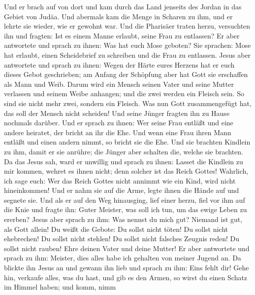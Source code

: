 Und er brach auf von dort und kam durch das Land jenseits
des Jordan in das Gebiet von Judäa. Und abermals kam die Menge in
Scharen zu ihm, und er lehrte sie wieder, wie er gewohnt war.
 Und die Pharisäer traten herzu, versuchten ihn und
fragten: Ist es einem Manne erlaubt, seine Frau zu entlassen?
 Er aber antwortete und sprach zu ihnen: Was hat euch Mose
geboten?  Sie sprachen: Mose hat erlaubt, einen
Scheidebrief zu schreiben und die Frau zu entlassen. 
Jesus aber antwortete und sprach zu ihnen: Wegen der Härte eures Herzens
hat er euch dieses Gebot geschrieben;  am Anfang der
Schöpfung aber hat Gott sie erschaffen als Mann und Weib. 
Darum wird ein Mensch seinen Vater und seine Mutter verlassen und seinem
Weibe anhangen;  und die zwei werden ein Fleisch sein. So
sind sie nicht mehr zwei, sondern ein Fleisch.  Was nun
Gott zusammengefügt hat, das soll der Mensch nicht scheiden!
 Und seine Jünger fragten ihn zu Hause nochmals darüber.
 Und er sprach zu ihnen: Wer seine Frau entläßt und eine
andere heiratet, der bricht an ihr die Ehe.  Und wenn
eine Frau ihren Mann entläßt und einen andern nimmt, so bricht sie die
Ehe.  Und sie brachten Kindlein zu ihm, damit er sie
anrühre; die Jünger aber schalten die, welche sie brachten.
 Da das Jesus sah, ward er unwillig und sprach zu ihnen:
Lasset die Kindlein zu mir kommen, wehret es ihnen nicht; denn solcher
ist das Reich Gottes!  Wahrlich, ich sage euch: Wer das
Reich Gottes nicht annimmt wie ein Kind, wird nicht hineinkommen!
 Und er nahm sie auf die Arme, legte ihnen die Hände auf
und segnete sie.  Und als er auf den Weg hinausging, lief
einer herzu, fiel vor ihm auf die Knie und fragte ihn: Guter Meister,
was soll ich tun, um das ewige Leben zu ererben?  Jesus
aber sprach zu ihm: Was nennst du mich gut? Niemand ist gut, als Gott
allein!  Du weißt die Gebote: Du sollst nicht töten! Du
sollst nicht ehebrechen! Du sollst nicht stehlen! Du sollst nicht
falsches Zeugnis reden! Du sollst nicht rauben! Ehre deinen Vater und
deine Mutter!  Er aber antwortete und sprach zu ihm:
Meister, dies alles habe ich gehalten von meiner Jugend an.
 Da blickte ihn Jesus an und gewann ihn lieb und sprach
zu ihm: Eins fehlt dir! Gehe hin, verkaufe alles, was du hast, und gib
es den Armen, so wirst du einen Schatz im Himmel haben; und komm, nimm
